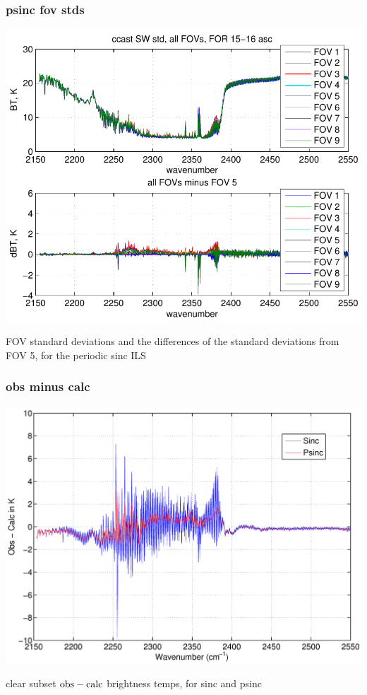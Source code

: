 \documentclass[11pt]{beamer}
\begin{document}
\begin{frame}
\frametitle{psinc fov stds}

\begin{center}
  \includegraphics[scale=0.6]{figures/hr2_std_p.pdf}
\end{center}

FOV standard deviations and the differences of the standard
deviations from FOV 5, for the periodic sinc ILS

\end{frame}
\begin{frame}
\frametitle{obs minus calc}

\begin{center}
  \includegraphics[scale=0.4]{strow_figs/bias_sinc_shortwave.pdf}
\end{center}

clear subset $\mbox{obs} - \mbox{calc}$ brightness temps, for sinc and psinc

\end{frame}
\end{document}
